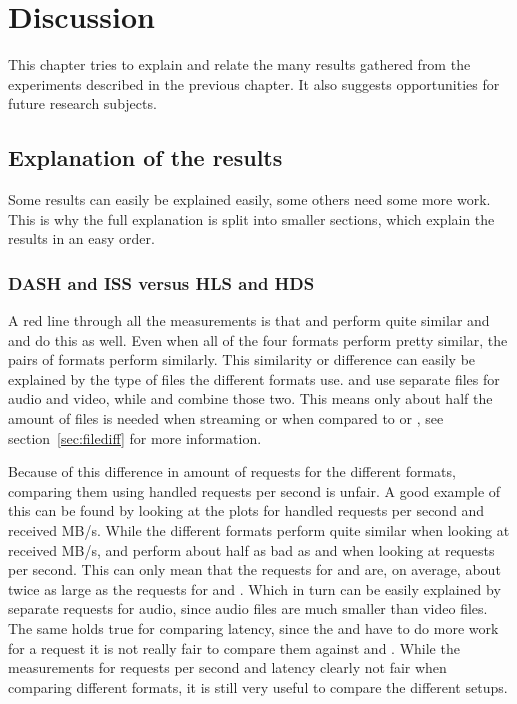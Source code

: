 \documentclass[twoside,openright]{uva-bachelor-thesis}
\begin{document}
\chapter{Discussion}
This chapter tries to explain and relate the many results gathered from the
experiments described in the previous chapter. It also suggests opportunities for
future research subjects.

\section{Explanation of the results}
Some results can easily be explained easily, some others need some more
work. This is why the full explanation is split into smaller sections, which
explain the results in an easy order.

\subsection{DASH and ISS versus HLS and HDS}\label{sec:audiovs}
A red line through all the measurements is that \hls and \hds perform
quite similar and \dash and \iss do this as well. Even when all of the four
formats perform pretty similar, the pairs of formats perform similarly.
This similarity or difference can easily be explained by the type of files the
different formats use. \dash and \iss use
separate files for audio and video, while \hls and \hds combine those two. This
means only about half the amount of files is needed when streaming \hls or \hds
when compared to \dash or \iss, see section~\ref{sec:filediff} for more
information.

Because of this difference in amount of requests for the different formats,
comparing them using handled requests per second is unfair. A good example of
this can be found by looking at the plots for handled requests per second and
received MB/s. While the different formats perform quite similar when looking at
received MB/s, \hls and \hds perform about half as bad as \dash and \iss when
looking at requests per second. This can only mean that the requests for \hds
and \hls are, on average, about twice as large as the requests for \dash and
\iss. Which in turn can be easily explained by separate requests for audio,
since audio files are much smaller than video files. The same holds true for
comparing latency, since the \hls and \hds have to do more work for a request it
is not really fair to compare them against \dash and \iss. While the
measurements for requests per second and latency clearly not fair when comparing
different formats, it is still very useful to compare the different setups.
\end{document}
